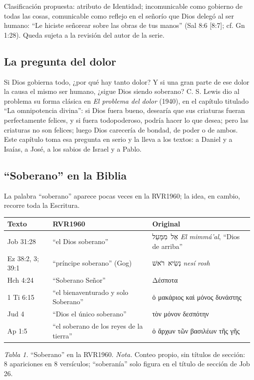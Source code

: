 \documentclass[11pt,letterpaper]{article}
\newcommand{\heb}[1]{\mbox{\foreignlanguage{hebrew}{#1}}}
\newcommand{\grc}[1]{\foreignlanguage{ancientgreek}{#1}}
\begin{document}
\begin{nota}[Precisión]
Clasificación propuesta: atributo de Identidad; incomunicable como gobierno de todas las cosas, comunicable como reflejo en el señorío que Dios delegó al ser humano: ``Le hiciste señorear sobre las obras de tus manos'' (Sal 8:6 [8:7]; cf. Gn 1:28). Queda sujeta a la revisión del autor de la serie.
\end{nota}

\subsection{La pregunta del dolor}
Si Dios gobierna todo, ¿por qué hay tanto dolor? Y si una gran parte de ese dolor la causa el mismo ser humano, ¿sigue Dios siendo soberano? C. S. Lewis dio al problema su forma clásica en \emph{El problema del dolor} (1940), en el capítulo titulado ``La omnipotencia divina'': si Dios fuera bueno, desearía que sus criaturas fueran perfectamente felices, y si fuera todopoderoso, podría hacer lo que desea; pero las criaturas no son felices; luego Dios carecería de bondad, de poder o de ambos. Este capítulo toma esa pregunta en serio y la lleva a los textos: a Daniel y a Isaías, a José, a los sabios de Israel y a Pablo.

\subsection{``Soberano'' en la Biblia}
La palabra ``soberano'' aparece pocas veces en la RVR1960; la idea, en cambio, recorre toda la Escritura.

\begin{center}\small\renewcommand{\arraystretch}{1.18}
\begin{tabular}{@{}L{2.6cm}L{4.4cm}L{6.6cm}@{}}
\toprule
\textbf{Texto} & \textbf{RVR1960} & \textbf{Original} \\ \midrule
Job 31:28 & ``el Dios soberano'' & \heb{אֵל מִמָּעַל} \emph{El mimmá'al}, ``Dios de arriba'' \\
Ez 38:2, 3; 39:1 & ``príncipe soberano'' (Gog) & \heb{נְשִׂיא רֹאשׁ} \emph{nesí rosh} \\
Hch 4:24 & ``Soberano Señor'' & \grc{Δέσποτα} \\
1 Ti 6:15 & ``el bienaventurado y solo Soberano'' & \grc{ὁ μακάριος καὶ μόνος δυνάστης} \\
Jud 4 & ``Dios el único soberano'' & \grc{τὸν μόνον δεσπότην} \\
Ap 1:5 & ``el soberano de los reyes de la tierra'' & \grc{ὁ ἄρχων τῶν βασιλέων τῆς γῆς} \\
\bottomrule
\end{tabular}\par
{\footnotesize\color{gris}\textit{Tabla 1.} ``Soberano'' en la RVR1960. \textit{Nota.} Conteo propio, sin títulos de sección: 8 apariciones en 8 versículos; ``soberanía'' solo figura en el título de sección de Job 26.}
\end{center}
\end{document}

